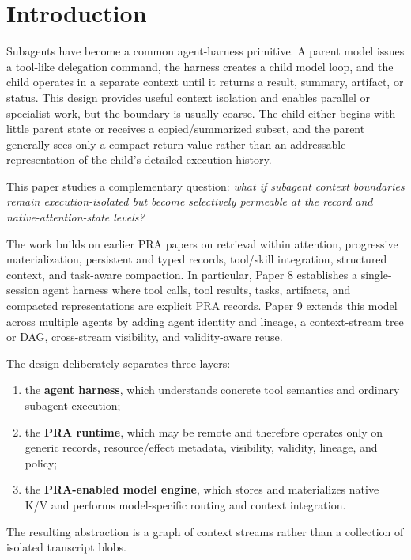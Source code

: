 \documentclass[11pt]{article}
\begin{document}
\section{Introduction}

Subagents have become a common agent-harness primitive. A parent model issues a tool-like delegation command, the harness creates a child model loop, and the child operates in a separate context until it returns a result, summary, artifact, or status. This design provides useful context isolation and enables parallel or specialist work, but the boundary is usually coarse. The child either begins with little parent state or receives a copied/summarized subset, and the parent generally sees only a compact return value rather than an addressable representation of the child's detailed execution history.

This paper studies a complementary question: \emph{what if subagent context boundaries remain execution-isolated but become selectively permeable at the record and native-attention-state levels?}

The work builds on earlier PRA papers on retrieval within attention, progressive materialization, persistent and typed records, tool/skill integration, structured context, and task-aware compaction. In particular, Paper 8 establishes a single-session agent harness where tool calls, tool results, tasks, artifacts, and compacted representations are explicit PRA records. Paper 9 extends this model across multiple agents by adding agent identity and lineage, a context-stream tree or DAG, cross-stream visibility, and validity-aware reuse.

The design deliberately separates three layers:

\begin{enumerate}[leftmargin=*]
    \item the \textbf{agent harness}, which understands concrete tool semantics and ordinary subagent execution;
    \item the \textbf{PRA runtime}, which may be remote and therefore operates only on generic records, resource/effect metadata, visibility, validity, lineage, and policy;
    \item the \textbf{PRA-enabled model engine}, which stores and materializes native K/V and performs model-specific routing and context integration.
\end{enumerate}

The resulting abstraction is a graph of context streams rather than a collection of isolated transcript blobs.
\end{document}
